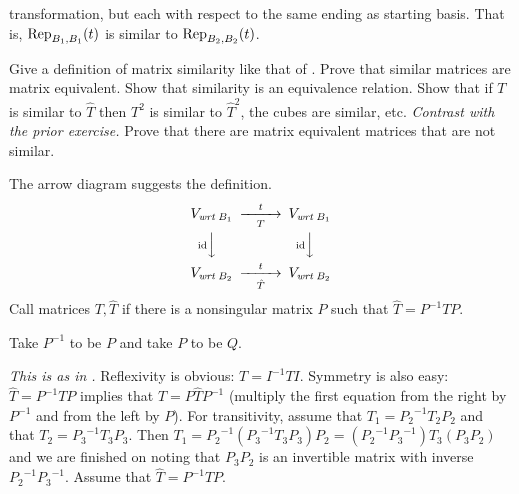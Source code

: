 \begin{exercises}
    transformation, but each with respect to the same ending as starting
    basis.
    That is, \( \rep{t}{B_1,B_1} \) is similar to \( \rep{t}{B_2,B_2} \).
    \begin{exparts}
      \partsitem Give a  definition of matrix similarity like that of
        .
      \partsitem Prove that similar matrices are matrix equivalent.
      \partsitem Show that similarity is an equivalence relation.
      \partsitem Show that if \( T \) is similar to \( \hat{T} \) then
        \( T^2 \) is similar to \( \hat{T}^2 \), the cubes are similar, etc.
        \textit{Contrast with the prior exercise.}
      \partsitem Prove that there are matrix equivalent matrices 
        that are not similar.
    \end{exparts}
    \begin{answer}
      \begin{exparts}
        \partsitem The 
          arrow diagram suggests the definition.
          \begin{equation*}
            \begin{CD}
              V_{\wrt{B_1}}                   @>t>T>        V_{\wrt{B_1}}       \\
              @V\scriptsize\identity VV        @V\scriptsize\identity VV \\
              V_{\wrt{B_2}}             @>t>\hat{T}>  V_{\wrt{B_2}}
            \end{CD}
          \end{equation*}
          Call matrices \( T, \hat{T} \)  if there
          is a nonsingular matrix \( P \) such that
          \( \hat{T}=P^{-1}TP \).
        \item Take \( P^{-1} \) to be \( P \) and take \( P \) to be \( Q \).
        \item \textit{This is as in .}
          Reflexivity is obvious: \( T=I^{-1}TI \).
          Symmetry is also easy: \( \hat{T}=P^{-1}TP \) implies that 
          \( T=P\hat{T}P^{-1} \) (multiply the first equation from the right
          by $P^{-1}$ and from the left by $P$).
          For transitivity, assume that \( T_1={P_2}^{-1}T_2P_2 \) and that 
          \( T_2={P_3}^{-1}T_3P_3 \).
          Then \( T_1={P_2}^{-1}({P_3}^{-1}T_3P_3)P_2
                     =({P_2}^{-1}{P_3}^{-1})T_3(P_3P_2) \) and we are finished
          on noting that \( P_3P_2 \) is an invertible matrix with inverse
          \( {P_2}^{-1}{P_3}^{-1} \).
        \partsitem Assume  that \( \hat{T}=P^{-1}TP \).

\end{exparts}
\end{answer}
\end{exercises}
